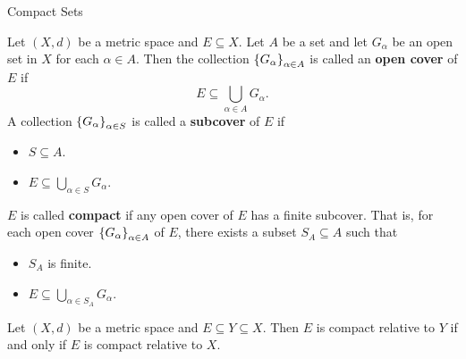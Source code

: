 \begin{section}{Compact Sets}

Let $(X, d)$ be a metric space and $E \subseteq X$. Let $A$ be a set and let $G_{\alpha}$
be an open set in $X$ for each $\alpha \in A$. Then the collection
$\set*{G_{\alpha}}_{\alpha \in A}$ is called an \textbf{open cover} of $E$ if
\[
E \subseteq \bigcup_{\alpha \in A} G_{\alpha}.
\]
A collection $\set*{G_{\alpha}}_{\alpha \in S}$ is called a \textbf{subcover} of $E$ if
\begin{itemize}
    \item $S \subseteq A$.
    \item $E \subseteq \displaystyle \bigcup_{\alpha \in S} G_{\alpha}$.
\end{itemize}
$E$ is called \textbf{compact} if any open cover of $E$ has a finite subcover. That is, for each
open cover $\set*{G_{\alpha}}_{\alpha \in A}$ of $E$, there exists a subset $S_{A} \subseteq A$ such that
\begin{itemize}
    \item $S_{A}$ is finite.
    \item $E \subseteq \displaystyle \bigcup_{\alpha \in S_{A}} G_{\alpha}$.
\end{itemize}

\bigskip

\begin{theorem} \label{thm:CompactnessPreservedUnderSubspace}
    Let $(X, d)$ be a metric space and $E \subseteq Y \subseteq X$.
    Then $E$ is compact relative to $Y$ if and only if $E$ is compact relative to $X$.
\end{theorem}


\end{section}
